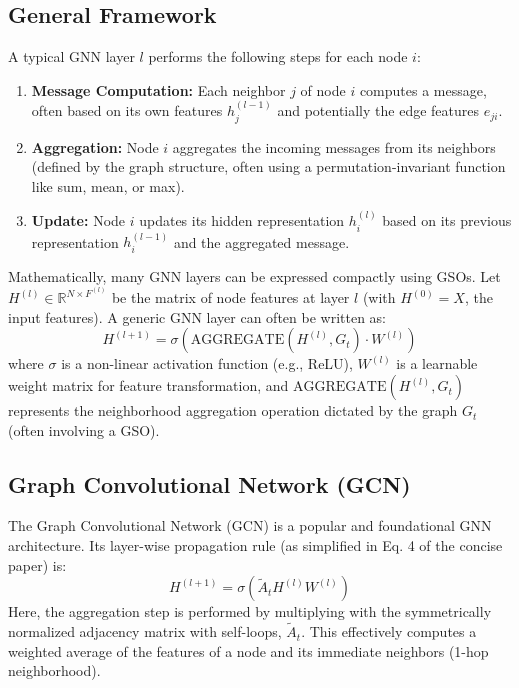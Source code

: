 \subsection{General Framework}
A typical GNN layer $l$ performs the following steps for each node $i$:
\begin{enumerate}
    \item \textbf{Message Computation:} Each neighbor $j$ of node $i$ computes a message, often based on its own features $h_j^{(l-1)}$ and potentially the edge features $e_{ji}$.
    \item \textbf{Aggregation:} Node $i$ aggregates the incoming messages from its neighbors (defined by the graph structure, often using a permutation-invariant function like sum, mean, or max).
    \item \textbf{Update:} Node $i$ updates its hidden representation $h_i^{(l)}$ based on its previous representation $h_i^{(l-1)}$ and the aggregated message.
\end{enumerate}
Mathematically, many GNN layers can be expressed compactly using GSOs. Let $H^{(l)} \in \mathbb{R}^{N \times F^{(l)}}$ be the matrix of node features at layer $l$ (with $H^{(0)} = X$, the input features). A generic GNN layer can often be written as:
\begin{equation}
    H^{(l+1)} = \sigma \left( \text{AGGREGATE} \left( H^{(l)}, G_t \right) \cdot W^{(l)} \right)
\end{equation}
where $\sigma$ is a non-linear activation function (e.g., ReLU), $W^{(l)}$ is a learnable weight matrix for feature transformation, and $\text{AGGREGATE}(H^{(l)}, G_t)$ represents the neighborhood aggregation operation dictated by the graph $G_t$ (often involving a GSO).

\subsection{Graph Convolutional Network (GCN)}
The Graph Convolutional Network (GCN) \cite{Kipf2017GCN} is a popular and foundational GNN architecture. Its layer-wise propagation rule (as simplified in Eq. 4 of the concise paper) is:
\begin{equation}
    H^{(l+1)} = \sigma \left( \tilde{A}_t H^{(l)} W^{(l)} \right)
    \label{eq:gcn_layer}
\end{equation}
Here, the aggregation step is performed by multiplying with the symmetrically normalized adjacency matrix with self-loops, $\tilde{A}_t$. This effectively computes a weighted average of the features of a node and its immediate neighbors (1-hop neighborhood).

